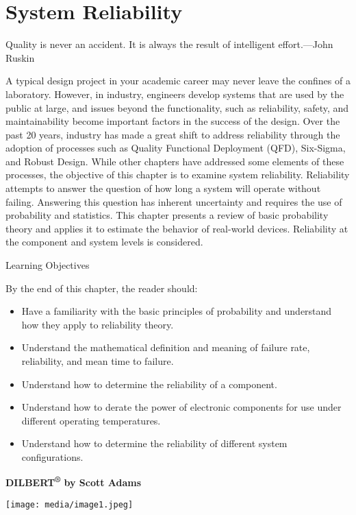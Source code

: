 \section{System Reliability}\label{system-reliability}

Quality is never an accident. It is always the result of intelligent
effort.---John Ruskin

A typical design project in your academic career may never leave the
confines of a laboratory. However, in industry, engineers develop
systems that are used by the public at large, and issues beyond the
functionality, such as reliability, safety, and maintainability become
important factors in the success of the design. Over the past 20 years,
industry has made a great shift to address reliability through the
adoption of processes such as Quality Functional Deployment (QFD),
Six-Sigma, and Robust Design. While other chapters have addressed some
elements of these processes, the objective of this chapter is to examine
system reliability. Reliability attempts to answer the question of how
long a system will operate without failing. Answering this question has
inherent uncertainty and requires the use of probability and statistics.
This chapter presents a review of basic probability theory and applies
it to estimate the behavior of real-world devices. Reliability at the
component and system levels is considered.

Learning Objectives

By the end of this chapter, the reader should:

\begin{itemize}
\item
  Have a familiarity with the basic principles of probability and
  understand how they apply to reliability theory.
\item
  Understand the mathematical definition and meaning of failure rate,
  reliability, and mean time to failure.
\item
  Understand how to determine the reliability of a component.
\item
  Understand how to derate the power of electronic components for use
  under different operating temperatures.
\item
  Understand how to determine the reliability of different system
  configurations.
\end{itemize}

\textbf{\hfill\break
DILBERT\textsuperscript{®} by Scott Adams}

\texttt{[image: media/image1.jpeg]}

